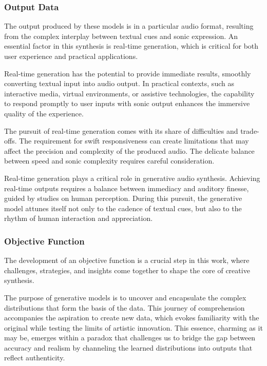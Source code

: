 \subsubsection{Output Data}

The output produced by these models is in a particular audio format, resulting from the complex interplay between textual cues and sonic expression. An essential factor in this synthesis is real-time generation, which is critical for both user experience and practical applications.

Real-time generation has the potential to provide immediate results, smoothly converting textual input into audio output. In practical contexts, such as interactive media, virtual environments, or assistive technologies, the capability to respond promptly to user inputs with sonic output enhances the immersive quality of the experience.

The pursuit of real-time generation comes with its share of difficulties and trade-offs. The requirement for swift responsiveness can create limitations that may affect the precision and complexity of the produced audio. The delicate balance between speed and sonic complexity requires careful consideration.

Real-time generation plays a critical role in generative audio synthesis. Achieving real-time outputs requires a balance between immediacy and auditory finesse, guided by studies on human perception. During this pursuit, the generative model attunes itself not only to the cadence of textual cues, but also to the rhythm of human interaction and appreciation.

\subsubsection{Objective Function}

The development of an objective function is a crucial step in this work, where challenges, strategies, and insights come together to shape the core of creative synthesis.

The purpose of generative models is to uncover and encapsulate the complex distributions that form the basis of the data. This journey of comprehension accompanies the aspiration to create new data, which evokes familiarity with the original while testing the limits of artistic innovation. This essence, charming as it may be, emerges within a paradox that challenges us to bridge the gap between accuracy and realism by channeling the learned distributions into outputs that reflect authenticity.

